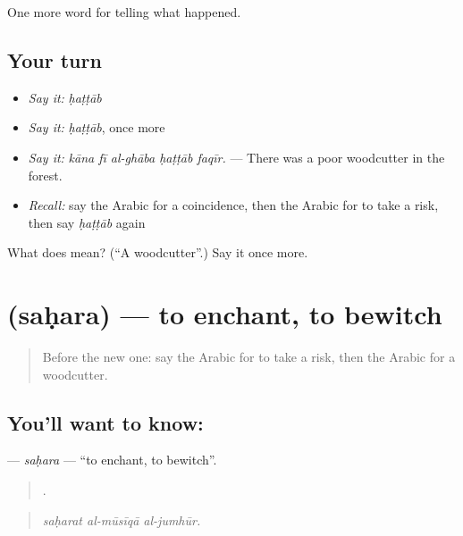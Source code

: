\begin{grammarlens}[title={What you've built}]
One more word for telling what happened.
\end{grammarlens}

\subsection*{Your turn}
\begin{itemize}
\raggedright
  \item \emph{Say it:} \emph{ḥaṭṭāb}
  \item \emph{Say it:} \emph{ḥaṭṭāb}, once more
  \item \emph{Say it:} \emph{kāna fī al-ghāba ḥaṭṭāb faqīr.} — There was a poor woodcutter in the forest.
  \item \emph{Recall:} say the Arabic for a coincidence, then the Arabic for to take a risk, then say \emph{ḥaṭṭāb} again
\end{itemize}

\begin{tcolorbox}[breakable,colback=teal!4,colframe=teal!35!black,title={Before you move on}]
What does  mean? (\textquotedblleft{}A woodcutter\textquotedblright{}.) Say it once more.
\end{tcolorbox}
\section[\texorpdfstring{\ar{سحر} (saḥara)}{سحر (saḥara)}]{ (saḥara) — to enchant, to bewitch}

\label{lesson:AR-C344-sahara}



\begin{quote}
Before the new one: say the Arabic for to take a risk, then the Arabic for a woodcutter.
\end{quote}

\subsection*{You'll want to know: }
\textbf{} — \emph{saḥara} — \textquotedblleft{}to enchant, to bewitch\textquotedblright{}.

\begin{quote}
  .
\end{quote}

\begin{quote}
\emph{saḥarat al-mūsīqā al-jumhūr.}
\end{quote}

